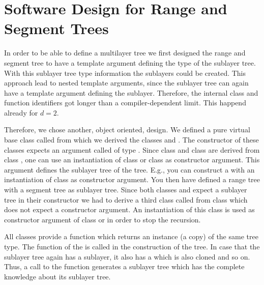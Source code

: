 \section{Software Design for Range and Segment Trees}

In order to be able to define a multilayer tree we first
designed the range and segment tree to have a template argument
defining the type of the sublayer tree. With this sublayer tree
type information the sublayers could be created. This approach lead to nested
template arguments, since the sublayer tree can again have a template
argument defining the sublayer. Therefore, the internal class and function
identifiers got longer than a compiler-dependent limit.
This happend already for $d=2$.

Therefore, we chose another, object oriented,
design. We defined  a pure
virtual base class called  from which we derived
the classes  and  .
The constructor of these classes expects an argument called
 of type . 
Since class  and class
 are derived from class , one can
use an instantiation of class  or class
 as constructor argument.
This argument defines the sublayer tree of the tree. E.g., you
can construct a  with an
instantiation of class  as constructor
argument. You then have defined a range tree with a segment tree
as sublayer tree. Since both classes  and 
 expect a sublayer tree in their constructor
we had to derive a third class called  from
class   which
does not expect a constructor argument. An instantiation of this
class is used as constructor argument of class  or
 in order to stop the recursion.

All classes provide a  function which returns an
instance (a copy) of the same tree type. The  
function of the  is called  in the
construction of the tree. In case that the sublayer tree again
has a sublayer, it also has a   which is
also cloned and so on. Thus, a call to the  function
generates a sublayer tree which has the complete knowledge about
its sublayer tree.

